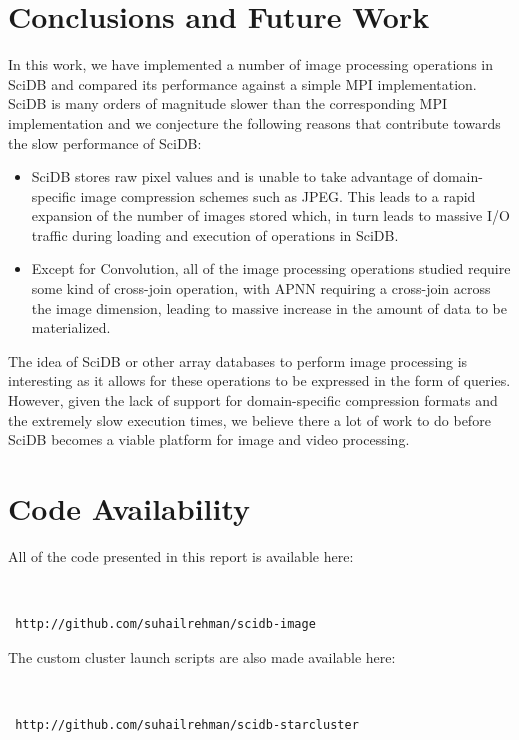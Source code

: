 \documentclass[letterpaper,twocolumn,10pt]{article}
\begin{document}
\section{Conclusions and Future Work}\label{sec:future}
In this work, we have implemented a number of image processing operations in SciDB and compared its performance against a simple MPI implementation. SciDB is many orders of magnitude slower than the corresponding MPI implementation and we conjecture the following reasons that contribute towards the slow performance of SciDB:

\begin{itemize}
\item SciDB stores raw pixel values and is unable to take advantage of domain-specific image compression schemes such as JPEG. This leads to a rapid expansion of the number of images stored which, in turn leads to massive I/O traffic during loading and execution of operations in SciDB.
\item Except for Convolution, all of the image processing operations studied require some kind of cross-join operation, with APNN requiring a cross-join across the image dimension, leading to massive increase in the amount of data to be materialized. 
\end{itemize} 

The idea of SciDB or other array databases to perform image processing is interesting as it allows for these operations to be expressed in the form of queries. However, given the lack of support for domain-specific compression formats and the extremely slow execution times, we believe there a lot of work to do before SciDB becomes a viable platform for image and video processing. 

\section{Code Availability}

All of the code presented in this report is available here:

{\tt \small
\begin{verbatim}
 http://github.com/suhailrehman/scidb-image
\end{verbatim}
}

The custom cluster launch scripts are also made available here:

{\tt \small
\begin{verbatim}
 http://github.com/suhailrehman/scidb-starcluster
\end{verbatim}
}


{\footnotesize 

}
\end{document}
